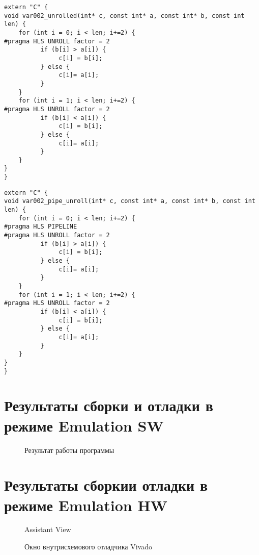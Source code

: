 \begin{lstlisting}[label=some-code-1,caption=Листинг кода с развёрткой]
extern "C" {
void var002_unrolled(int* c, const int* a, const int* b, const int len) {
    for (int i = 0; i < len; i+=2) {
#pragma HLS UNROLL factor = 2
          if (b[i] > a[i]) {
               c[i] = b[i];
          } else {
               c[i]= a[i];
          }
    }
    for (int i = 1; i < len; i+=2) {
#pragma HLS UNROLL factor = 2
          if (b[i] < a[i]) {
               c[i] = b[i];
          } else {
               c[i]= a[i];
          }
    }
}
}
\end{lstlisting}

\begin{lstlisting}[label=some-code-1,caption=Листинг кода с развёрткой и конвейерной организацией]
extern "C" {
void var002_pipe_unroll(int* c, const int* a, const int* b, const int len) {
    for (int i = 0; i < len; i+=2) {
#pragma HLS PIPELINE
#pragma HLS UNROLL factor = 2
          if (b[i] > a[i]) {
               c[i] = b[i];
          } else {
               c[i]= a[i];
          }
    }
    for (int i = 1; i < len; i+=2) {
#pragma HLS UNROLL factor = 2
          if (b[i] < a[i]) {
               c[i] = b[i];
          } else {
               c[i]= a[i];
          }
    }
}
}

\end{lstlisting}


\chapter{Результаты сборки и отладки в режиме Emulation SW}

\begin{figure}[ph!]
	\caption{Результат работы программы}
\end{figure}

\newpage

\chapter{Результаты сборкии отладки в режиме Emulation HW}

\begin{figure}[ph!]
	\caption{Assistant View}
\end{figure}

\begin{figure}[ph!]
	\caption{Окно внутрисхемового отладчика Vivado}
\end{figure}

